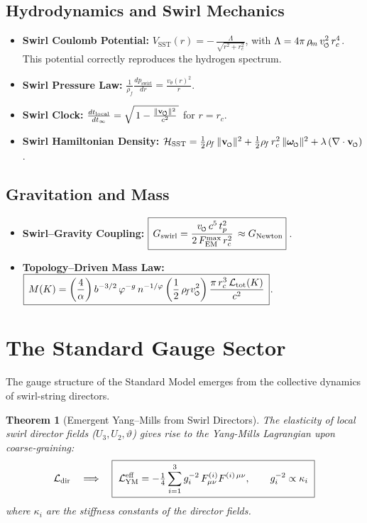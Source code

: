 \documentclass[11pt]{article}
\newcommand{\swirlarrow}{%
    \mathchoice{\mkern-2mu\scriptstyle\boldsymbol{\circlearrowleft}}%
    {\mkern-2mu\scriptstyle\boldsymbol{\circlearrowleft}}%
    {\mkern-2mu\scriptscriptstyle\boldsymbol{\circlearrowleft}}%
    {\mkern-2mu\scriptscriptstyle\boldsymbol{\circlearrowleft}}%
}
\newcommand{\vswirl}{\mathbf{v}_{\swirlarrow}}
\newcommand{\omegas}{\boldsymbol{\omega}_{\swirlarrow}}  %
\newcommand{\vscore}{v_{\swirlarrow}}                    %
\newcommand{\rhof}{\rho_{\!f}}                           %
\newcommand{\rhom}{\rho_{\!m}}                           %
\newcommand{\rc}{r_c}                                    %
\newcommand{\FmaxEM}{F_{\mathrm{EM}}^{\max}}             %
\newtheorem{theorem}{Theorem}[section]
\begin{document}
    \subsection*{Hydrodynamics and Swirl Mechanics}
        \begin{itemize}
        \item \textbf{Swirl Coulomb Potential:} $V_{\text{SST}}(r)=-\,\frac{\Lambda}{\sqrt{r^2+\rc^2}}$, with $\Lambda = 4\pi\,\rhom\,\vscore^2\,\rc^4$. This potential correctly reproduces the hydrogen spectrum.
        \item \textbf{Swirl Pressure Law:} $\frac{1}{\rhof}\frac{dp_{\text{swirl}}}{dr}=\frac{v_\theta(r)^2}{r}$.
        \item \textbf{Swirl Clock:} $\frac{dt_{\text{local}}}{dt_{\infty}} = \sqrt{\,1 - \frac{\|\vswirl\|^2}{c^2}\,}$ for $r=\rc$.
        \item \textbf{Swirl Hamiltonian Density:} $\mathcal{H}_{\text{SST}} = \frac{1}{2}\rhof\,\|\vswirl\|^2 + \frac{1}{2}\rhof\,\rc^2\,\|\omegas\|^2 + \lambda\,(\nabla\cdot \vswirl)$.
        \end{itemize}

    \subsection*{Gravitation and Mass}
        \begin{itemize}
        \item \textbf{Swirl–Gravity Coupling:} $\boxed{\,G_{\text{swirl}} = \frac{\vscore\,c^5\,t_p^2}{2\,\FmaxEM\,\rc^2}\, \approx G_{\text{Newton}}}\,$.
        \item \textbf{Topology–Driven Mass Law:} $\boxed{\,M(K) = \left(\frac{4}{\alpha}\right) b^{-3/2}\,\varphi^{-g}\,n^{-1/\varphi} \left(\frac{1}{2}\,\rhof \vscore^2\right) \frac{\pi\,\rc^3\,\mathcal{L}_{\text{tot}}(K)}{c^2}\,}$.
        \end{itemize}

\section{The Standard Gauge Sector}
    \label{sec:gauge_core}
    The gauge structure of the Standard Model emerges from the collective dynamics of swirl-string directors.

    \begin{theorem}[Emergent Yang–Mills from Swirl Directors]
    The elasticity of local swirl director fields ($U_3, U_2, \vartheta$) gives rise to the Yang-Mills Lagrangian upon coarse-graining:
    \[ \mathcal L_{\rm dir} \quad \Longrightarrow \quad \boxed{\ \mathcal L_{\rm YM}^{\rm eff}=-\tfrac14\sum_{i=1}^3 g_i^{-2}\,F^{(i)}_{\mu\nu}F^{(i)\,\mu\nu},\qquad g_i^{-2} \propto \kappa_i\ } \]
    where $\kappa_i$ are the stiffness constants of the director fields.
    \end{theorem}
\end{document}
